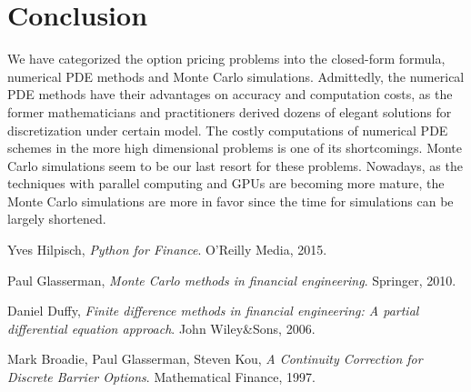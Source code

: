 \section*{Conclusion}
We have categorized the option pricing problems into the closed-form formula, numerical PDE methods and Monte Carlo simulations. Admittedly, the numerical PDE methods have their advantages on accuracy and computation costs, as the former mathematicians and practitioners derived dozens of elegant solutions for discretization under certain model. The costly computations of numerical PDE schemes in the more high dimensional problems is one of its shortcomings. Monte Carlo simulations seem to be our last resort for these problems. Nowadays, as the techniques with parallel computing and GPUs are becoming more mature, the Monte Carlo simulations are more in favor since the time for simulations can be largely shortened.

\begin{thebibliography}{9}
Yves Hilpisch,
\textit{Python for Finance}. 
O'Reilly Media, 2015.
 
Paul Glasserman,
\textit{Monte Carlo methods in financial engineering}.
Springer, 2010.

Daniel Duffy,
\textit{Finite difference methods in financial engineering: A partial differential equation approach}.
John Wiley\&Sons, 2006.

Mark Broadie, Paul Glasserman, Steven Kou,
\textit{A Continuity Correction for Discrete Barrier Options}.
Mathematical Finance, 1997.

\end{thebibliography}
